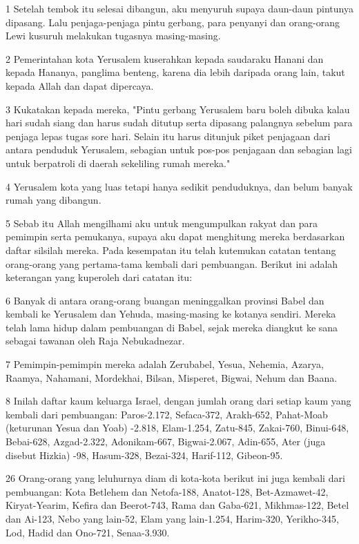 \par 1 Setelah tembok itu selesai dibangun, aku menyuruh supaya daun-daun pintunya dipasang. Lalu penjaga-penjaga pintu gerbang, para penyanyi dan orang-orang Lewi kusuruh melakukan tugasnya masing-masing.
\par 2 Pemerintahan kota Yerusalem kuserahkan kepada saudaraku Hanani dan kepada Hananya, panglima benteng, karena dia lebih daripada orang lain, takut kepada Allah dan dapat dipercaya.
\par 3 Kukatakan kepada mereka, "Pintu gerbang Yerusalem baru boleh dibuka kalau hari sudah siang dan harus sudah ditutup serta dipasang palangnya sebelum para penjaga lepas tugas sore hari. Selain itu harus ditunjuk piket penjagaan dari antara penduduk Yerusalem, sebagian untuk pos-pos penjagaan dan sebagian lagi untuk berpatroli di daerah sekeliling rumah mereka."
\par 4 Yerusalem kota yang luas tetapi hanya sedikit penduduknya, dan belum banyak rumah yang dibangun.
\par 5 Sebab itu Allah mengilhami aku untuk mengumpulkan rakyat dan para pemimpin serta pemukanya, supaya aku dapat menghitung mereka berdasarkan daftar silsilah mereka. Pada kesempatan itu telah kutemukan catatan tentang orang-orang yang pertama-tama kembali dari pembuangan. Berikut ini adalah keterangan yang kuperoleh dari catatan itu:
\par 6 Banyak di antara orang-orang buangan meninggalkan provinsi Babel dan kembali ke Yerusalem dan Yehuda, masing-masing ke kotanya sendiri. Mereka telah lama hidup dalam pembuangan di Babel, sejak mereka diangkut ke sana sebagai tawanan oleh Raja Nebukadnezar.
\par 7 Pemimpin-pemimpin mereka adalah Zerubabel, Yesua, Nehemia, Azarya, Raamya, Nahamani, Mordekhai, Bilsan, Misperet, Bigwai, Nehum dan Baana.
\par 8 Inilah daftar kaum keluarga Israel, dengan jumlah orang dari setiap kaum yang kembali dari pembuangan: Paros-2.172, Sefaca-372, Arakh-652, Pahat-Moab (keturunan Yesua dan Yoab) -2.818, Elam-1.254, Zatu-845, Zakai-760, Binui-648, Bebai-628, Azgad-2.322, Adonikam-667, Bigwai-2.067, Adin-655, Ater (juga disebut Hizkia) -98, Hasum-328, Bezai-324, Harif-112, Gibeon-95.
\par 26 Orang-orang yang leluhurnya diam di kota-kota berikut ini juga kembali dari pembuangan: Kota Betlehem dan Netofa-188, Anatot-128, Bet-Azmawet-42, Kiryat-Yearim, Kefira dan Beerot-743, Rama dan Gaba-621, Mikhmas-122, Betel dan Ai-123, Nebo yang lain-52, Elam yang lain-1.254, Harim-320, Yerikho-345, Lod, Hadid dan Ono-721, Senaa-3.930.
